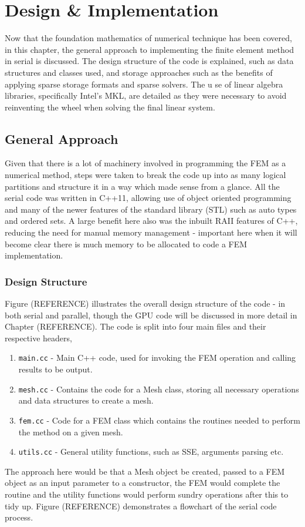 \clearpage
\chapter{Design \& Implementation}

Now that the foundation mathematics of numerical technique has been covered, in this chapter, the general approach to implementing the finite element method in serial is discussed. The design structure of the code is explained, such as data structures and classes used, and storage approaches such as the benefits of applying sparse storage formats and sparse solvers. The u se of linear algebra libraries, specifically Intel's MKL, are detailed as they were necessary to avoid reinventing the wheel when solving the final linear system. 
 
\section{General Approach}

Given that there is a lot of machinery involved in programming the FEM as a numerical method, steps were taken to break the code up into as many logical partitions and structure it in a way which made sense from a glance. All the serial code was written in C++11, allowing use of object oriented programming and many of the newer features of the standard library (STL) such as auto types and ordered sets. A large benefit here also was the inbuilt RAII features of C++, reducing the need for manual memory management - important here when it will become clear there is much memory to be allocated to code a FEM implementation.

\subsection{Design Structure}

Figure (REFERENCE) illustrates the overall design structure of the code - in both serial and parallel, though the GPU code will be discussed in more detail in Chapter (REFERENCE). The code is split into four main files and their respective headers,
\begin{enumerate}
	\item \texttt{main.cc} - Main C++ code, used for invoking the FEM operation and calling results to be output.
	\item \texttt{mesh.cc} - Contains the code for a Mesh class, storing all necessary operations and data structures to create a mesh.
	\item \texttt{fem.cc} - Code for a FEM class which contains the routines needed to perform the method on a given mesh.
	\item \texttt{utils.cc} - General utility functions, such as SSE, arguments parsing etc.
\end{enumerate}
The approach here would be that a Mesh object be created, passed to a FEM object as an input parameter to a constructor, the FEM would complete the routine and the utility functions would perform sundry operations after this to tidy up. Figure (REFERENCE) demonstrates a flowchart of the serial code process.

